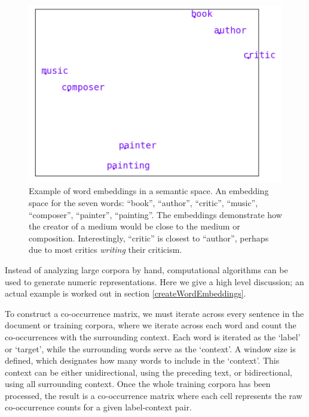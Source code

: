 \begin{figure}[h]
    \centering
    \includegraphics[scale=.5]{./images/Word_vector_demo.png}
    \caption[Generated using \url{http://vectors.nlpl.eu/explore/embeddings/en/}.]{Example of word embeddings in a semantic space. An embedding space for the seven words: ``book'', ``author'', ``critic'', ``music'', ``composer'', ``painter'', ``painting''. The embeddings demonstrate how the creator of a medium would be close to the medium or composition. Interestingly, ``critic'' is closest to ``author'', perhaps due to most critics \textit{writing} their criticism.}
 \label{f:writerPainterExample}
\end{figure}


Instead of analyzing large corpora by hand, computational algorithms can be used to generate numeric representations. Here we give a high level discussion; an actual example is worked out in section \ref{createWordEmbeddings}.

To construct a co-occurrence matrix, we must iterate across every sentence in the document or training corpora, where we iterate across each word and count the co-occurrences with the surrounding context. Each word is iterated as the `label' or `target', while the surrounding words serve as the `context'. A window size is defined, which designates how many words to include in the `context'. This context can be either unidirectional, using the preceding text, or bidirectional, using all surrounding context. Once the whole training corpora has been processed, the result is a co-occurrence matrix where each cell represents the raw co-occurrence counts for a given label-context pair.

